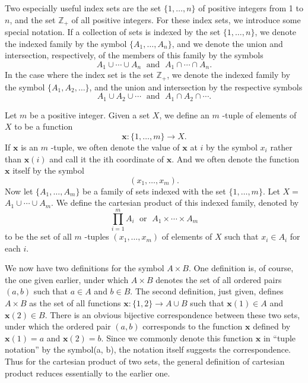 Two especially useful index sets are the set \(\{1,\ldots, n\}\) of positive integers 
from 1 to \(n\), and the set \(\mathbb{Z}_{+}\) of all positive integers. 
For these index sets, we introduce some special notation. If a collection of sets is 
indexed by the set \(\{1,\ldots, n\}\), we denote the indexed family by the symbol 
\(\{{A_{1},\ldots ,A_{n}}\}\), and we denote the union and intersection, 
respectively, of the members of this family by the symbols
\[
A_{1} \cup \cdots \cup {A}_{n}\;\text{ and }\;A_{1} \cap \cdots \cap {A}_{n}.
\]
In the case where the index set is the set \(\mathbb{Z}_{+}\), 
we denote the indexed family by the symbol \(\{{A_{1},A_{2},\ldots}\}\), 
and the union and intersection by the respective symbols
\[
A_{1} \cup {A}_{2} \cup \cdots \;\text{ and }\;A_{1} \cap {A}_{2} \cap \cdots \text{.}
\]

\begin{definition}
 Let \(m\) be a positive integer. Given a set \(X\), we define an \(m\) -tuple of elements of \(X\) to be a function
 \[
 \mathbf{x} : \{1,\ldots, m\} \rightarrow X.
 \]
 If \(\mathbf{x}\) is an \(m\) -tuple, we often denote the value of \(\mathbf{x}\) at \(i\) by the symbol \(x_{i}\) rather than \(\mathbf{x}(i)\) and call it the ith coordinate of \(\mathbf{x}\). And we often denote the function \(\mathbf{x}\) itself by the symbol
 \[
 ({x_{1},\ldots ,x_{m}}) \text{.}
 \]
 Now let \(\{ {A_{1},\ldots ,A_{m}}\}\) be a family of sets indexed with the set \(\{1,\ldots, m\}\). Let \(X =\) \(A_{1} \cup \cdots \cup {A}_{m}\). We define the cartesian product of this indexed family, denoted by
 \[
 \mathop{\prod }\limits_{{i = 1}}^{m}A_{i}\;\text{ or }\;A_{1} \times \cdots \times {A}_{m}
 \]
 to be the set of all \(m\) -tuples \(({x_{1},\ldots ,x_{m}})\) of elements of \(X\) such that \(x_{i} \in {A}_{i}\) for each \(i\).
\end{definition}

\begin{centeredblock}
 \begin{example}
\label{ex:\thesection.\theexample}
 We now have two definitions for the symbol \(A \times B\). One definition is, of course, the one given earlier, under which \(A \times B\) denotes the set of all ordered pairs \((a, b)\) such that \(a \in A\) and \(b \in B\). The second definition, just given, defines \(A \times B\) as the set of all functions \(\mathbf{x} : \{1,2\} \rightarrow A \cup B\) such that \(\mathbf{x}(1) \in A\) and \(\mathbf{x}(2) \in B\). There is an obvious bijective correspondence between these two sets, under which the ordered pair \((a, b)\) corresponds to the function \(\mathbf{x}\) defined by \(\mathbf{x}(1) = a\) and \(\mathbf{x}(2) = b\). Since we commonly denote this function \(\mathbf{x}\) in ``tuple notation'' by the symbol(a, b), the notation itself suggests the correspondence. Thus for the cartesian product of two sets, the general definition of cartesian product reduces essentially to the earlier one.
 \end{example}
\end{centeredblock}

